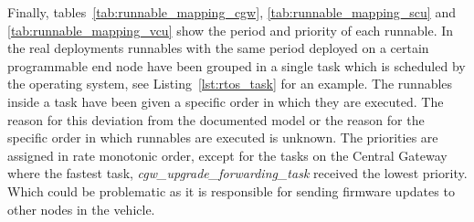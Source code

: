 Finally, tables~\ref{tab:runnable_mapping_cgw}, \ref{tab:runnable_mapping_scu} and \ref{tab:runnable_mapping_vcu} show the period and priority of each runnable. In the real deployments runnables with the same period deployed on a certain programmable end node have been grouped in a single task which is scheduled by the operating system, see Listing~\ref{lst:rtos_task} for an example. The runnables inside a task have been given a specific order in which they are executed. The reason for this deviation from the documented model or the reason for the specific order in which runnables are executed is unknown. The priorities are assigned in rate monotonic order, except for the tasks on the Central Gateway where the fastest task, \textit{cgw\_upgrade\_forwarding\_task} received the lowest priority. Which could be problematic as it is responsible for sending firmware updates to other nodes in the vehicle.

